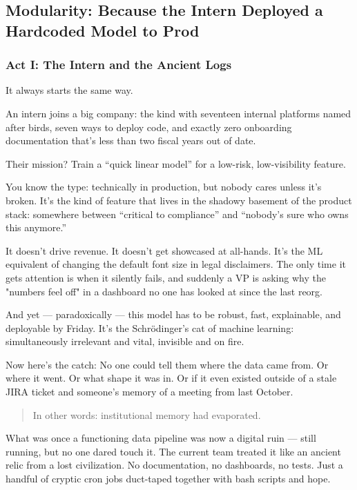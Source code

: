 \subsection{Modularity: Because the Intern Deployed a Hardcoded Model to Prod}

\subsubsection{Act I: The Intern and the Ancient Logs}

It always starts the same way.

An intern joins a big company: the kind with seventeen internal platforms named after birds, seven ways to deploy code, and exactly zero onboarding documentation that's less than two fiscal years out of date.

Their mission? Train a “quick linear model” for a low-risk, low-visibility feature.

You know the type: technically in production, but nobody cares unless it’s broken. It’s the kind of feature that lives in the shadowy basement of the product stack: somewhere between “critical to compliance” and “nobody’s sure who owns this anymore.” 

It doesn’t drive revenue. It doesn’t get showcased at all-hands. It’s the ML equivalent of changing the default font size in legal disclaimers. The only time it gets attention is when it silently fails, and suddenly a VP is asking why the "numbers feel off" in a dashboard no one has looked at since the last reorg.

And yet --- paradoxically --- this model has to be robust, fast, explainable, and deployable by Friday. It’s the Schrödinger’s cat of machine learning: simultaneously irrelevant and vital, invisible and on fire.


Now here's the catch: No one could tell them where the data came from.  Or where it went.  Or what shape it was in.  Or if it even existed outside of a stale JIRA ticket and someone’s memory of a meeting from last October.

\begin{quote}
In other words: institutional memory had evaporated.
\end{quote}

What was once a functioning data pipeline was now a digital ruin — still running, but no one dared touch it. The current team treated it like an ancient relic from a lost civilization. No documentation, no dashboards, no tests. Just a handful of cryptic cron jobs duct-taped together with bash scripts and hope.

